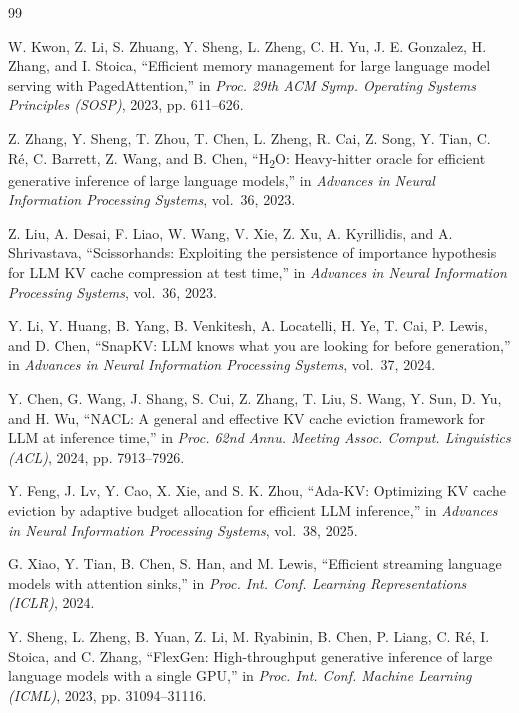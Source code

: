 \documentclass[manuscript,anonymous,review]{acmart}
\begin{document}
\begin{thebibliography}{99}

W. Kwon, Z. Li, S. Zhuang, Y. Sheng, L. Zheng, C. H. Yu, J. E. Gonzalez,
H. Zhang, and I. Stoica, ``Efficient memory management for large language
model serving with PagedAttention,'' in \emph{Proc. 29th ACM Symp. Operating
Systems Principles (SOSP)}, 2023, pp. 611--626.

Z. Zhang, Y. Sheng, T. Zhou, T. Chen, L. Zheng, R. Cai, Z. Song, Y. Tian,
C. R\'e, C. Barrett, Z. Wang, and B. Chen, ``H\textsubscript{2}O: Heavy-hitter
oracle for efficient generative inference of large language models,'' in
\emph{Advances in Neural Information Processing Systems}, vol.~36, 2023.

Z. Liu, A. Desai, F. Liao, W. Wang, V. Xie, Z. Xu, A. Kyrillidis, and
A. Shrivastava, ``Scissorhands: Exploiting the persistence of importance
hypothesis for LLM KV cache compression at test time,'' in \emph{Advances in
Neural Information Processing Systems}, vol.~36, 2023.

Y. Li, Y. Huang, B. Yang, B. Venkitesh, A. Locatelli, H. Ye, T. Cai, P. Lewis,
and D. Chen, ``SnapKV: LLM knows what you are looking for before generation,''
in \emph{Advances in Neural Information Processing Systems}, vol.~37, 2024.

Y. Chen, G. Wang, J. Shang, S. Cui, Z. Zhang, T. Liu, S. Wang, Y. Sun, D. Yu,
and H. Wu, ``NACL: A general and effective KV cache eviction framework for LLM
at inference time,'' in \emph{Proc. 62nd Annu. Meeting Assoc. Comput.
Linguistics (ACL)}, 2024, pp. 7913--7926.

Y. Feng, J. Lv, Y. Cao, X. Xie, and S. K. Zhou, ``Ada-KV: Optimizing KV cache
eviction by adaptive budget allocation for efficient LLM inference,'' in
\emph{Advances in Neural Information Processing Systems}, vol.~38, 2025.

G. Xiao, Y. Tian, B. Chen, S. Han, and M. Lewis, ``Efficient streaming language
models with attention sinks,'' in \emph{Proc. Int. Conf. Learning
Representations (ICLR)}, 2024.

Y. Sheng, L. Zheng, B. Yuan, Z. Li, M. Ryabinin, B. Chen, P. Liang, C. R\'e,
I. Stoica, and C. Zhang, ``FlexGen: High-throughput generative inference of
large language models with a single GPU,'' in \emph{Proc. Int. Conf. Machine
Learning (ICML)}, 2023, pp. 31094--31116.


\end{thebibliography}
\end{document}
